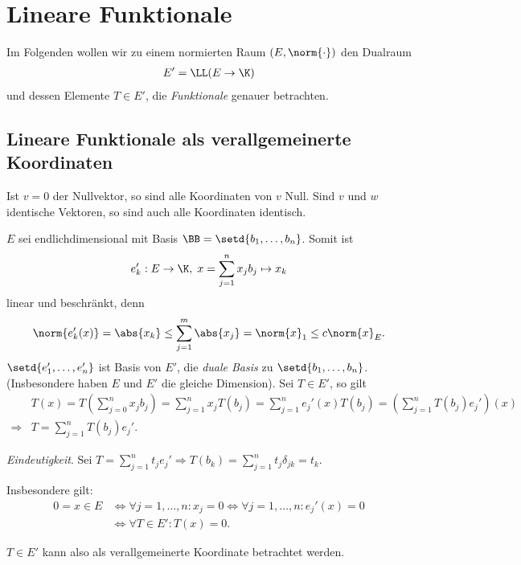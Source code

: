 \chapter{Lineare Funktionale}

Im Folgenden wollen wir zu einem normierten Raum $(E,\norm{\cdot})$ den Dualraum
\begin{align*}
E'=\LL(E\to\K)
\end{align*}
und dessen Elemente $T\in E'$, die
\emph{Funktionale} genauer betrachten.

\section{Lineare Funktionale als verallgemeinerte Koordinaten}

Ist $v=0$ der Nullvektor, so sind alle Koordinaten von $v$ Null. Sind $v$ und
$w$ identische Vektoren, so sind auch alle Koordinaten identisch.

\begin{bsp}
\label{bsp:4.1}
$E$ sei endlichdimensional mit Basis $\BB=\setd{b_1,\ldots,b_n}$. Somit ist
\begin{align*}
e_k' : E\to \K,\; x =\sum\limits_{j=1}^n x_j b_j \mapsto x_k
\end{align*}
linear und beschränkt, denn
\begin{align*}
\norm{e_k'(x)} = \abs{x_k} \le \sum\limits_{j=1}^m \abs{x_j} = \norm{x}_1
\le c\norm{x}_E.
\end{align*}
$\setd{e_1',\ldots,e_n'}$ ist Basis von $E'$, die \emph{duale Basis} zu
$\setd{b_1,\ldots,b_n}$. (Insbesondere haben $E$ und $E'$ die gleiche
Dimension). Sei $T\in E'$, so gilt
\begin{align*}
&T(x) = T\left(\sum\limits_{j=0}^n x_j b_j\right)
= \sum\limits_{j=1}^n x_j T(b_j) = \sum\limits_{j=1}^n e_j'(x)T(b_j)
= \left(\sum\limits_{j=1}^n T(b_j)e_j' \right)(x)\\
\Rightarrow& T = \sum\limits_{j=1}^n T(b_j)e_j'.
\end{align*}

\textit{Eindeutigkeit}. Sei $T=\sum\limits_{j=1}^n t_j e_j' \Rightarrow T(b_k)
= \sum\limits_{j=1}^n t_j\delta_{jk} = t_k$.

Insbesondere gilt:
\begin{align*}
0=x\in E &\Leftrightarrow \forall j=1,\ldots,n : x_j = 0
\Leftrightarrow \forall j=1,\ldots,n : e_j'(x) = 0 \\ 
& \Leftrightarrow \forall T\in E' : T(x) = 0.
\end{align*}

$T\in E'$ kann also als verallgemeinerte Koordinate betrachtet werden.\bsphere
\end{bsp}

